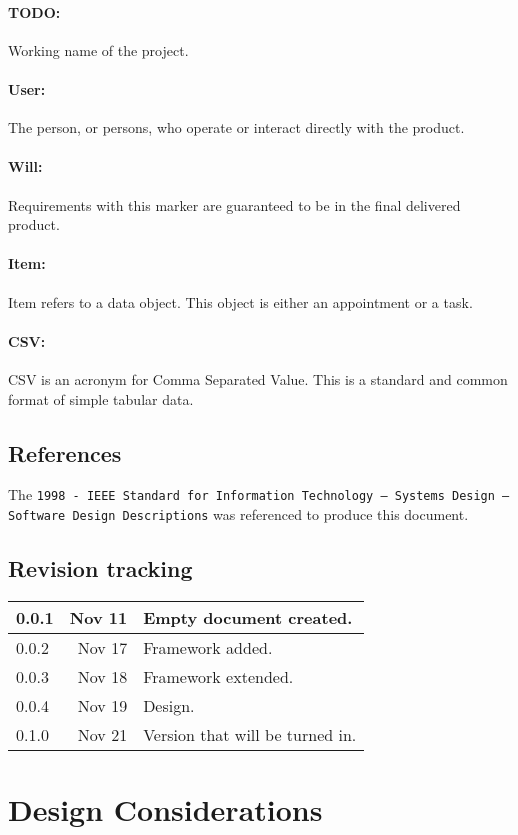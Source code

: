 \documentclass[12pt]{article}
\begin{document}
\paragraph{TODO:} Working name of the project.
\paragraph{User:} The person, or persons, who operate or interact directly with the product.
\paragraph{Will:} Requirements with this marker are guaranteed to be in the final delivered product.
\paragraph{Item:} Item refers to a data object. This object is either an appointment or a task.
\paragraph{CSV:} CSV is an acronym for Comma Separated Value. This is a standard and common format of simple tabular data.

\subsection{References}
The {\tt 1998 - IEEE Standard for Information Technology -- Systems Design -- Software Design Descriptions} was referenced to produce this document.

\subsection{Revision tracking}
\begin{tabular}{|l|r|p{4.6in}|}
\hline
0.0.1 & Nov 11 & Empty document created.\\
\hline
0.0.2 & Nov 17 & Framework added.\\
\hline
0.0.3 & Nov 18 & Framework extended.\\
\hline
0.0.4 & Nov 19 & Design.\\
\hline
0.1.0 & Nov 21 & Version that will be turned in.\\
\hline
\end{tabular}

\section{Design Considerations}
\end{document}
